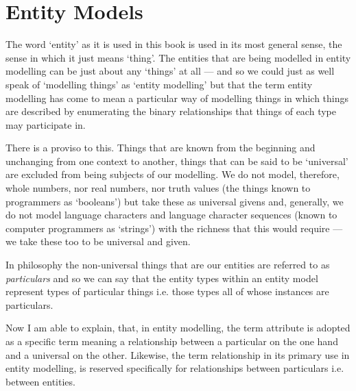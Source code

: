 

\section{Entity Models}
\label{EntityModels}
\mynote The word `entity' as it is used in this book is used in its most general sense,  the sense in which it just means `thing'. The entities that are being modelled in entity modelling can be just about any `things' at all --- and so we could just as well speak of `modelling things' as `entity modelling' but that the term entity modelling
has come to mean a particular way of modelling things in which things are described by enumerating the binary relationships that things of each type may participate in.

\mynote There is a proviso to this. 
Things that are known from the beginning and unchanging from one context to another, things that can be said to be `universal' are excluded from being subjects of our modelling. We do not model, therefore, whole numbers, nor real numbers, nor truth values 
(the things known to programmers as `booleans') but take these as universal givens and, generally, 
we do not model language characters and language character sequences 
(known to computer programmers as `strings') with the richness that this would require --- we take these too to be universal and given. 

\mynote In philosophy the non-universal things that are our entities are referred to as \textit{particulars} and so we can say that the entity types within an entity model represent types of particular things i.e. those types all of whose instances are particulars.  

\mynote Now I am able to explain, that, in entity modelling, the term attribute is adopted as a specific term meaning a relationship between a particular on the one hand and a universal on the other. 
Likewise, the term relationship 
in its primary use in entity modelling, is reserved specifically for relationships between particulars 
i.e. between entities. 

